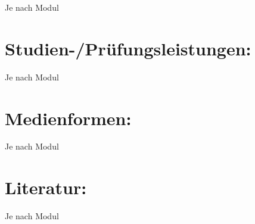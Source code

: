 Je nach Modul

\section*{Studien-/Prüfungsleistungen:}\label{studien-pruxfcfungsleistungen-26}

Je nach Modul

\section*{Medienformen:}\label{medienformen-19}

Je nach Modul

\section*{Literatur:}\label{literatur-24}

Je nach Modul
